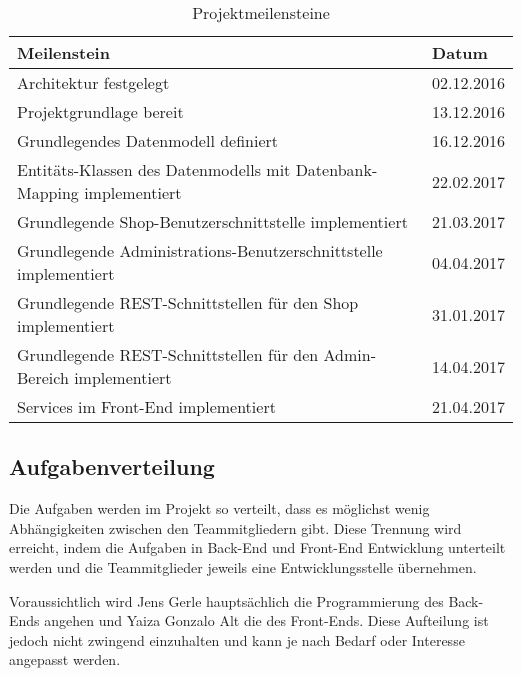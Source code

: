 \begin{table}[ht!]
\begin{tabular}{|p{}|p{}|}
	\hline 
	\textbf{Meilenstein} & \textbf{Datum} \\ 
	\hline 
	Architektur festgelegt & 02.12.2016 \\ 
	\hline 
	Projektgrundlage bereit & 13.12.2016 \\ 
	\hline 
	Grundlegendes Datenmodell definiert & 16.12.2016 \\ 
	\hline 
	Entitäts-Klassen des Datenmodells mit Datenbank-Mapping implementiert & 22.02.2017 \\ 
	\hline 
	Grundlegende Shop-Benutzerschnittstelle implementiert & 21.03.2017 \\ 
	\hline 
	Grundlegende Administrations-Benutzerschnittstelle implementiert & 04.04.2017 \\ 
	\hline 
	Grundlegende REST-Schnittstellen für den Shop implementiert & 31.01.2017 \\ 
	\hline 
	Grundlegende REST-Schnittstellen für den Admin-Bereich implementiert & 14.04.2017 \\ 
	\hline 
	Services im Front-End implementiert	& 21.04.2017 \\ 
	\hline 
\end{tabular} 
\caption{Projektmeilensteine} \label{tab:milestones}
\end{table}


\subsection{Aufgabenverteilung}
Die Aufgaben werden im Projekt so verteilt, dass es möglichst wenig Abhängigkeiten zwischen den Teammitgliedern gibt. Diese Trennung wird erreicht, indem die Aufgaben in Back-End und Front-End Entwicklung unterteilt werden und die Teammitglieder jeweils eine Entwicklungsstelle übernehmen.

Voraussichtlich wird Jens Gerle hauptsächlich die Programmierung des Back-Ends angehen und Yaiza Gonzalo Alt die des Front-Ends. Diese Aufteilung ist jedoch nicht zwingend einzuhalten und kann je nach Bedarf oder Interesse angepasst werden.















